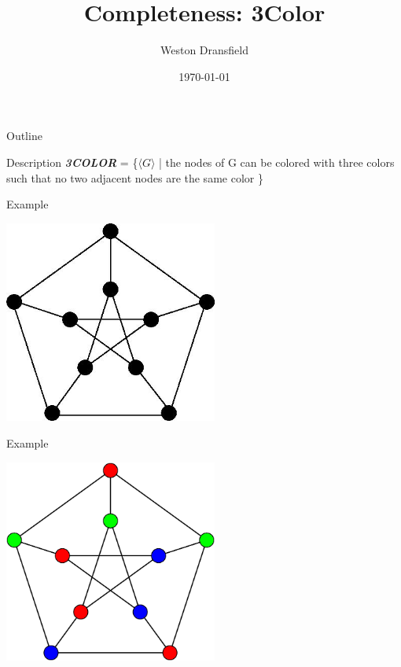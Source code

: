 \documentclass[bigger]{beamer}
\author{Weston Dransfield}
\date{\today}
\title{Completeness: 3Color}
\begin{document}
\maketitle
\begin{frame}{Outline}
\tableofcontents
\end{frame}


\begin{frame}[label=sec-1]{Description}
\textbf{\textit{3COLOR}} = \{\(\langle G \rangle\) | the nodes of G can be colored with three colors such that no two adjacent nodes are the same color \}
\end{frame}

\begin{frame}[label=sec-2]{Example}
\begin{center}
\includegraphics[width=7cm]{uncolored.jpg}
\end{center}
\end{frame}

\begin{frame}[label=sec-3]{Example}
\begin{center}
\includegraphics[width=7cm]{colored.png}
\end{center}
\end{frame}
\end{document}
